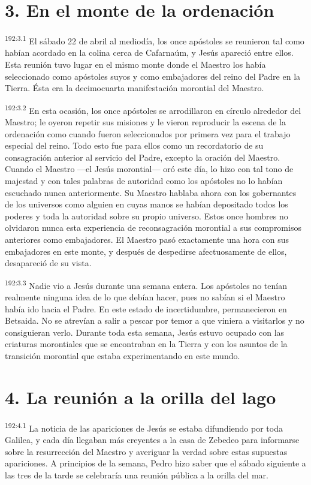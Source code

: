 \section*{3. En el monte de la ordenación}
\par 
\textsuperscript{192:3.1} El sábado 22 de abril al mediodía, los once apóstoles se reunieron tal como habían acordado en la colina cerca de Cafarnaúm, y Jesús apareció entre ellos. Esta reunión tuvo lugar en el mismo monte donde el Maestro los había seleccionado como apóstoles suyos y como embajadores del reino del Padre en la Tierra. Ésta era la decimocuarta manifestación morontial del Maestro.

\par 
\textsuperscript{192:3.2} En esta ocasión, los once apóstoles se arrodillaron en círculo alrededor del Maestro; le oyeron repetir sus misiones y le vieron reproducir la escena de la ordenación como cuando fueron seleccionados por primera vez para el trabajo especial del reino. Todo esto fue para ellos como un recordatorio de su consagración anterior al servicio del Padre, excepto la oración del Maestro. Cuando el Maestro ---el Jesús morontial--- oró este día, lo hizo con tal tono de majestad y con tales palabras de autoridad como los apóstoles no lo habían escuchado nunca anteriormente. Su Maestro hablaba ahora con los gobernantes de los universos como alguien en cuyas manos se habían depositado todos los poderes y toda la autoridad sobre su propio universo. Estos once hombres no olvidaron nunca esta experiencia de reconsagración morontial a sus compromisos anteriores como embajadores. El Maestro pasó exactamente una hora con sus embajadores en este monte, y después de despedirse afectuosamente de ellos, desapareció de su vista.

\par 
\textsuperscript{192:3.3} Nadie vio a Jesús durante una semana entera. Los apóstoles no tenían realmente ninguna idea de lo que debían hacer, pues no sabían si el Maestro había ido hacia el Padre. En este estado de incertidumbre, permanecieron en Betsaida. No se atrevían a salir a pescar por temor a que viniera a visitarlos y no consiguieran verlo. Durante toda esta semana, Jesús estuvo ocupado con las criaturas morontiales que se encontraban en la Tierra y con los asuntos de la transición morontial que estaba experimentando en este mundo.

\section*{4. La reunión a la orilla del lago}
\par 
\textsuperscript{192:4.1} La noticia de las apariciones de Jesús se estaba difundiendo por toda Galilea, y cada día llegaban más creyentes a la casa de Zebedeo para informarse sobre la resurrección del Maestro y averiguar la verdad sobre estas supuestas apariciones. A principios de la semana, Pedro hizo saber que el sábado siguiente a las tres de la tarde se celebraría una reunión pública a la orilla del mar.

